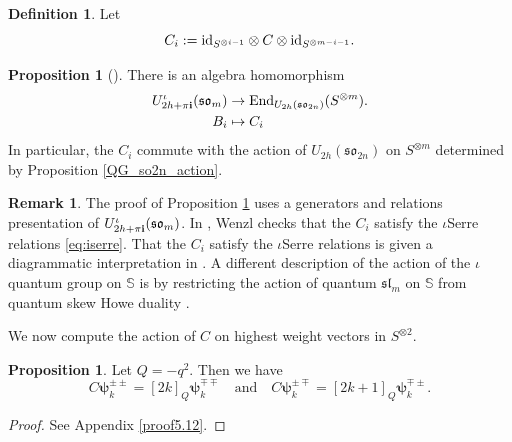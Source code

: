 \documentclass[10pt]{amsart}
\numberwithin{equation}{section}
\theoremstyle{definition}
\newtheorem{remark}[theorem]{Remark}
\newtheorem{proposition}[theorem]{Proposition}
\newtheorem{definition}[theorem]{Definition}
\newcommand{\End}{{\rm End}}
\newcommand{\id}{{\rm id}}
\newcommand{\slm}{\mathfrak{sl}_{m}}
\newcommand{\son}[1][2n]{\mathfrak{so}_{#1}}
\newcommand{\ot}{\otimes}
\newcommand{\hwp}{\boldsymbol{\psi}}
\newcommand{\howespin}{\boldsymbol{\mathbb{S}}}
\begin{document}
\begin{definition}
    Let 
    \begin{equation}\label{c_i}
        C_i:=\id_{S^{\ot i-1}}\ot C \ot \id_{S^{\ot m-i-1}}.
    \end{equation}
\end{definition}

\begin{proposition}[{\cite[Proposition 4.2]{Wenzl-Spin}}]\label{b-action}
    There is an algebra homomorphism
    \begin{align*}
        U^{\iota}_{2h+\pi {\bf i}}(\mathfrak{so}_m)&\rightarrow \End_{U_{2h}(\son)}(S^{\otimes m}). \\
        B_i&\mapsto C_i
    \end{align*}
    In particular, the $C_i$ commute with the action of $U_{2h}(\son)$ on $S^{\otimes m}$ determined by Proposition \ref{QG_so2n_action}.
\end{proposition}

\begin{remark}
    The proof of Proposition \ref{b-action} uses a generators and relations presentation of $U^{\iota}_{2h+\pi {\bf i}}(\mathfrak{so}_m)$. In \cite[Proposition 4.2]{Wenzl-Spin}, Wenzl checks that the $C_i$ satisfy the $\iota$Serre relations \ref{eq:iserre}. That the $C_i$ satisfy the $\iota$Serre relations is given a diagrammatic interpretation in \cite{MR4824565, mcnamara2025quantumspinbrauercategory}. A different description of the action of the $\iota$quantum group on $\howespin$ is by restricting the action of quantum $\slm$ on $\howespin$ from quantum skew Howe duality \cite{aboumrad2022skewhowedualitytypes}.
\end{remark}

We now compute the action of $C$ on highest weight vectors in $S^{\ot 2}$.

\begin{proposition}\label{C-action}
    Let $Q=-q^2$. Then we have
    \begin{equation}\label{eq:2kand2kp1}
        C\hwp^{\pm \pm}_k= [2k]_Q \hwp_k^{\mp\mp} \quad \text{and} \quad C\hwp^{\pm \mp}_k= [2k+1]_Q \hwp_k^{\mp\pm}.
    \end{equation}
\end{proposition}

\begin{proof}
    See Appendix \ref{proof5.12}.
\end{proof}
\end{document}
